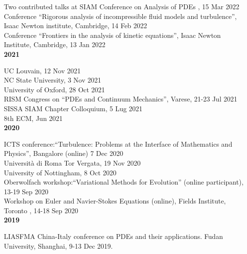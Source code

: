 \documentclass[10pt]{article}
\newcommand{\blankline}{\quad\pagebreak[2]}
\begin{document}
Two contributed  talks at  SIAM Conference on Analysis of PDEs , 15 Mar 2022\\


Conference ``Rigorous analysis of incompressible fluid models and turbulence'', Isaac Newton institute, Cambridge, 14 Feb 2022\\

Conference ``Frontiers in the analysis of kinetic equations'', Isaac Newton Institute, Cambridge, 13 Jan 2022\\


\textbf{2021}
\blankline

UC Louvain, 12 Nov 2021\\

NC State University, 3 Nov 2021\\


University of Oxford, 28 Oct 2021\\


RISM Congress on ``PDEs and Continuum Mechanics'', Varese, 21-23 Jul 2021\\


SISSA SIAM Chapter Colloquium, 5 Lug 2021\\

8th ECM, Jun 2021\\

\textbf{2020}\\
\blankline 

ICTS conference:``Turbulence: Problems at the Interface of Mathematics and Physics'', Bangalore (online) 7 Dec 2020\\

Universit\`a di Roma Tor Vergata, 19 Nov 2020\\


University of Nottingham, 8 Oct 2020\\


Oberwolfach workshop:``Variational Methods for Evolution'' (online participant), 13-19 Sep 2020\\

Workshop on Euler and Navier-Stokes Equations (online), Fields Institute, Toronto , 14-18 Sep 2020\\



\textbf{2019}\\
\blankline

LIASFMA China-Italy conference on PDEs and their applications. Fudan University, Shanghai, 9-13 Dec 2019.\\
\end{document}
